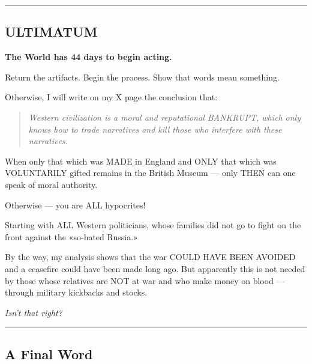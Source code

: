 \documentclass[11pt,a4paper]{article}
\theoremstyle{definition}
\theoremstyle{remark}
\begin{document}
\begin{center}
\rule{0.8\textwidth}{0.4pt}
\end{center}

\subsection{ULTIMATUM}

\begin{center}
\Large\textbf{The World has 44 days to begin acting.}
\end{center}

Return the artifacts. Begin the process. Show that words mean something.

Otherwise, I will write on my X page the conclusion that:

\begin{quote}
\large\textit{Western civilization is a moral and reputational BANKRUPT, which only knows how to trade narratives and kill those who interfere with these narratives.}
\end{quote}

When only that which was MADE in England and ONLY that which was VOLUNTARILY gifted remains in the British Museum — only THEN can one speak of moral authority.

Otherwise — you are ALL hypocrites!

Starting with ALL Western politicians, whose families did not go to fight on the front against the «so-hated Russia.»

\vspace{1em}

By the way, my analysis shows that the war COULD HAVE BEEN AVOIDED and a ceasefire could have been made long ago. But apparently this is not needed by those whose relatives are NOT at war and who make money on blood — through military kickbacks and stocks.

\textit{Isn't that right?}

\vspace{2em}

\begin{center}
\rule{0.8\textwidth}{0.4pt}
\end{center}

\subsection{A Final Word}
\end{document}
